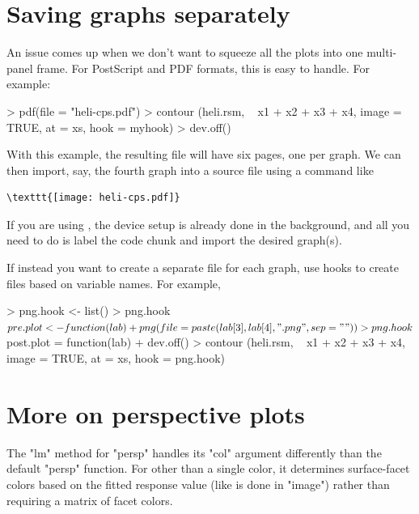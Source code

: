 \documentclass[article,nojss]{jss}
\begin{document}
\section{Saving graphs separately}
An issue comes up when we don't want to squeeze all the plots into one multi-panel frame.  For PostScript and PDF formats, this is easy to handle.  For example:
\begin{Schunk}
\begin{Sinput}
> pdf(file = "heli-cps.pdf")
> contour (heli.rsm, ~ x1 + x2 + x3 + x4, image = TRUE, at = xs, hook = myhook)
> dev.off()
\end{Sinput}
\end{Schunk}
With this example, the resulting file will have six pages, one per graph.  We can then import, say, the fourth graph into a  source file using a command like
\begin{verbatim}
\texttt{[image: heli-cps.pdf]}
\end{verbatim}
If you are using , the device setup is already done in the background, and all you need to do is label the code chunk and import the desired graph(s).


If instead you want to create a separate file for each graph, use hooks to create files based on variable names.  For example,
\begin{Schunk}
\begin{Sinput}
> png.hook <- list()
> png.hook$pre.plot <- function(lab) 
+     png(file = paste(lab[3], lab[4], ".png", sep = ""))
> png.hook$post.plot = function(lab)
+     dev.off()
> contour (heli.rsm, ~ x1 + x2 + x3 + x4, image = TRUE, at = xs, hook = png.hook)
\end{Sinput}
\end{Schunk}

\section{More on perspective plots}
The "lm" method for "persp" handles its "col" argument differently than the default "persp" function.  For other than a single color, it determines surface-facet colors based on the fitted response value (like is done in "image") rather than requiring a matrix of facet colors.
\end{document}
